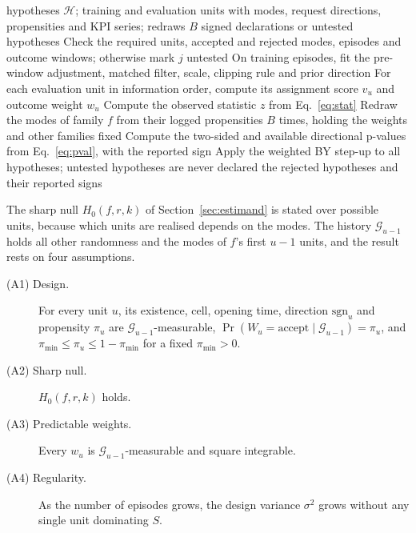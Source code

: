 \begin{algorithm}[tbp]
\caption{PMRT declarations.}
\label{alg:pmrt}
\footnotesize
\begin{algorithmic}[1]
\Require hypotheses $\mathcal{H}$; training and evaluation units with modes, request directions, propensities and KPI
  series; redraws $B$
\Ensure signed declarations or untested hypotheses
  \State Check the required units, accepted and rejected modes, episodes and outcome windows; otherwise mark $j$
    untested
  \State On training episodes, fit the pre-window adjustment, matched filter, scale, clipping rule and prior direction
  \State For each evaluation unit in information order, compute its assignment score $v_u$ and outcome weight $w_u$
  \State Compute the observed statistic $z$ from Eq.~\eqref{eq:stat}
  \State Redraw the modes of family $f$ from their logged propensities $B$ times, holding the weights and other
    families fixed
  \State Compute the two-sided and available directional p-values from Eq.~\eqref{eq:pval}, with the reported sign
\EndFor
\State Apply the weighted BY step-up to all hypotheses; untested hypotheses are never declared
\State \Return the rejected hypotheses and their reported signs
\end{algorithmic}
\end{algorithm}

The sharp null $H_0(f, r, k)$ of Section~\ref{sec:estimand} is stated over possible units, because which units are
realised depends on the modes. The history $\mathcal{G}_{u-1}$ holds all other randomness and the modes of $f$'s first
$u - 1$ units, and the result rests on four assumptions.

\begin{description}
\item[(A1) Design.] For every unit $u$, its existence, cell, opening time, direction $\mathrm{sgn}_u$ and propensity
  $\pi_u$ are $\mathcal{G}_{u-1}$-measurable, $\Pr(W_u = \text{accept} \mid \mathcal{G}_{u-1}) = \pi_u$, and
  $\pi_{\min} \le \pi_u \le 1 - \pi_{\min}$ for a fixed $\pi_{\min} > 0$.
\item[(A2) Sharp null.] $H_0(f, r, k)$ holds.
\item[(A3) Predictable weights.] Every $w_u$ is $\mathcal{G}_{u-1}$-measurable and square integrable.
\item[(A4) Regularity.] As the number of episodes grows, the design variance $\sigma^2$ grows without any single unit
  dominating $S$.
\end{description}

